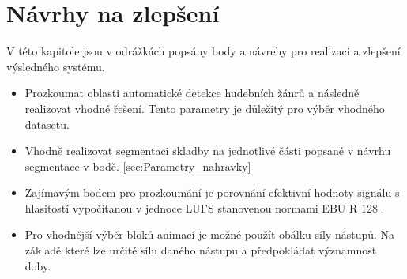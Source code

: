 \section{Návrhy na zlepšení}
V této kapitole jsou v odrážkách popsány body a návrehy pro realizaci a zlepšení výsledného systému. 

\begin{itemize}
    \item Prozkoumat oblasti automatické detekce hudebních žánrů a následně realizovat vhodné řešení. Tento parametry je důležitý pro výběr vhodného datasetu. 
    \item Vhodně realizovat segmentaci skladby na jednotlivé části popsané v návrhu segmentace v bodě. \ref{sec:Parametry_nahravky}
    \item Zajímavým bodem pro prozkoumání je porovnání efektivní hodnoty signálu s hlasitostí vypočítanou v jednoce LUFS stanovenou normami EBU R 128 \cite{EBU_R_128}. 
    \item Pro vhodnější výběr bloků animací je možné použít obálku síly nástupů. Na základě které lze určitě sílu daného nástupu a předpokládat významnost doby.
\end{itemize}

